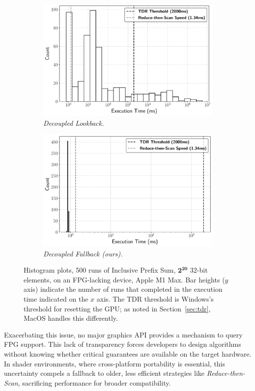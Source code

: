 \documentclass[acmsmall, manuscript, screen, review, anonymous]{acmart}
\begin{document}
\begin{figure}
  \centering
  \begin{subfigure}[b]{0.45\linewidth}
    \includegraphics[width=\linewidth]{graphics/decoupled_lookback.pdf}
    \caption{\emph{Decoupled Lookback.}}
    \label{fig:decoupled}
  \end{subfigure}
  \hfill
  \begin{subfigure}[b]{0.45\linewidth}
    \includegraphics[width=\linewidth]{graphics/ours.pdf}
    \caption{\emph{Decoupled Fallback (ours).}}
    \label{fig:ours}
  \end{subfigure}
  \caption{Histogram plots, 500 runs of Inclusive Prefix Sum, $\mathbf{2^{20}}$ 32-bit elements, on an FPG-lacking device, Apple M1 Max. Bar heights ($y$ axis) indicate the number of runs that completed in the execution time indicated on the $x$ axis. The TDR threshold is Windows's threshold for resetting the GPU\@; as noted in Section~\ref{sec:tdr}, MacOS handles this differently.}
  \label{fig:dist}
\end{figure}
Exacerbating this issue, no major graphics API provides a mechanism to query FPG support. This lack of transparency forces developers to design algorithms without knowing whether critical guarantees are available on the target hardware. In shader environments, where cross-platform portability is essential, this uncertainty compels a fallback to older, less efficient strategies like \emph{Reduce-then-Scan}, sacrificing performance for broader compatibility.
\end{document}
